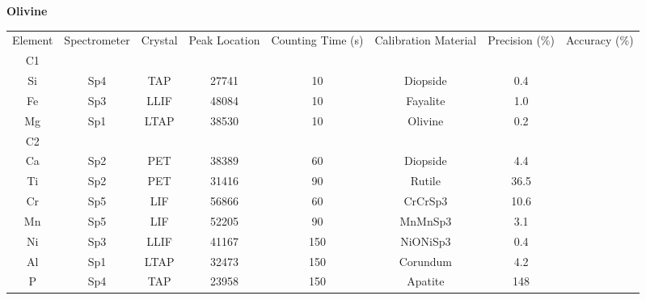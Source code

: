 \documentclass[draft]{agujournal2019}
\begin{document}
\begin{table}[!htbp]
\begin{subtable}[h]{1\textwidth}
\centering
\textbf{Olivine} \\ 
\vspace{5pt}
\begin{adjustbox}{width=1\textwidth, center=1\textwidth}
\begin{tabular}{c c c c c c c c}
\hline 
\multirow{3}{*}{Element} & \multirow{3}{*}{Spectrometer} & \multirow{3}{*}{Crystal} & \multirow{3}{*}{Peak Location} & \multirow{3}{2cm}{\centering Counting Time (s)}  & \multirow{3}{2cm}{\centering Calibration Material} & \multirow{3}{*}{Precision (\%)} & \multirow{3}{*}{Accuracy (\%)}\\ 
\\ 
\\
\hline
C1 &  &  &  &  &  & & \\
Si & Sp4 & TAP & 27741 & 10 & Diopside & 0.4&  \\
Fe & Sp3 & LLIF & 48084 & 10 & Fayalite & 1.0 &  \\
Mg & Sp1 & LTAP & 38530 & 10 & Olivine & 0.2 &  \\
C2 &  &  &  &  &  & & \\
Ca & Sp2 & PET & 38389 & 60 & Diopside & 4.4 &  \\
Ti & Sp2 & PET & 31416 & 90 & Rutile & 36.5 &  \\
Cr & Sp5 & LIF & 56866 & 60 & CrCrSp3 & 10.6 &  \\
Mn & Sp5 & LIF & 52205 & 90 & MnMnSp3 & 3.1 &  \\
Ni & Sp3 & LLIF & 41167 & 150 & NiONiSp3 & 0.4 &  \\
Al & Sp1 & LTAP & 32473 & 150 & Corundum & 4.2 &  \\
P & Sp4 & TAP & 23958 & 150 & Apatite & 148 &  \\
\hline 
\end{tabular}
\end{adjustbox}
\vspace{3pt}
\end{subtable}

\end{table}




\end{document}
